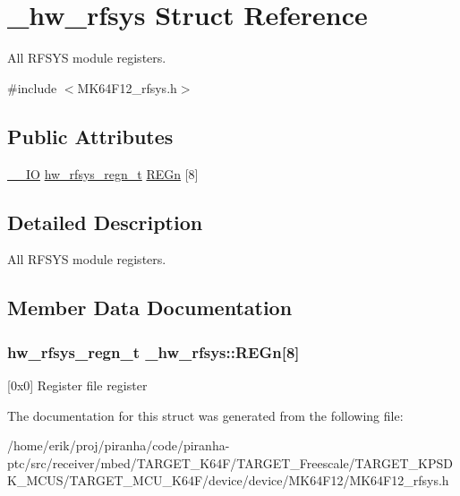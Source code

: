 \hypertarget{struct__hw__rfsys}{}\section{\+\_\+hw\+\_\+rfsys Struct Reference}
\label{struct__hw__rfsys}


All R\+F\+S\+YS module registers.  




{\ttfamily \#include $<$M\+K64\+F12\+\_\+rfsys.\+h$>$}

\subsection*{Public Attributes}
\begin{DoxyCompactItemize}
\item 
\hyperlink{core__sc300_8h_aec43007d9998a0a0e01faede4133d6be}{\+\_\+\+\_\+\+IO} \hyperlink{union__hw__rfsys__regn}{hw\+\_\+rfsys\+\_\+regn\+\_\+t} \hyperlink{struct__hw__rfsys_af8f3ad49efda608d590174d9360c4aa7}{R\+E\+Gn} \mbox{[}8\mbox{]}
\end{DoxyCompactItemize}


\subsection{Detailed Description}
All R\+F\+S\+YS module registers. 

\subsection{Member Data Documentation}
\subsubsection[{\texorpdfstring{R\+E\+Gn}{REGn}}]{ {\bf hw\+\_\+rfsys\+\_\+regn\+\_\+t} \+\_\+hw\+\_\+rfsys\+::\+R\+E\+Gn\mbox{[}8\mbox{]}}\hypertarget{struct__hw__rfsys_af8f3ad49efda608d590174d9360c4aa7}{}\label{struct__hw__rfsys_af8f3ad49efda608d590174d9360c4aa7}
\mbox{[}0x0\mbox{]} Register file register 

The documentation for this struct was generated from the following file\+:\begin{DoxyCompactItemize}
\item 
/home/erik/proj/piranha/code/piranha-\/ptc/src/receiver/mbed/\+T\+A\+R\+G\+E\+T\+\_\+\+K64\+F/\+T\+A\+R\+G\+E\+T\+\_\+\+Freescale/\+T\+A\+R\+G\+E\+T\+\_\+\+K\+P\+S\+D\+K\+\_\+\+M\+C\+U\+S/\+T\+A\+R\+G\+E\+T\+\_\+\+M\+C\+U\+\_\+\+K64\+F/device/device/\+M\+K64\+F12/M\+K64\+F12\+\_\+rfsys.\+h\end{DoxyCompactItemize}
